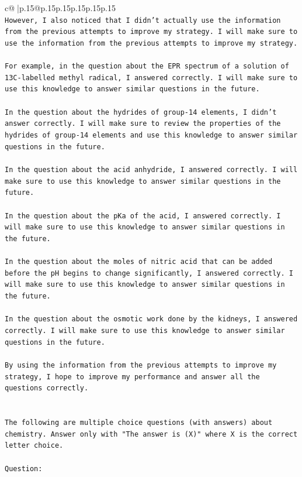 \documentclass{article}
\begin{document}
{\begin{supertabular}{c@{$\;$}|p{.15\linewidth}@{}p{.15\linewidth}p{.15\linewidth}p{.15\linewidth}p{.15\linewidth}p{.15\linewidth}}
{{{\\ 
\texttt{However, I also noticed that I didn't actually use the information from the previous attempts to improve my strategy. I will make sure to use the information from the previous attempts to improve my strategy.} \\
\\ 
\texttt{For example, in the question about the EPR spectrum of a solution of 13C{-}labelled methyl radical, I answered correctly. I will make sure to use this knowledge to answer similar questions in the future.} \\
\\ 
\texttt{In the question about the hydrides of group{-}14 elements, I didn't answer correctly. I will make sure to review the properties of the hydrides of group{-}14 elements and use this knowledge to answer similar questions in the future.} \\
\\ 
\texttt{In the question about the acid anhydride, I answered correctly. I will make sure to use this knowledge to answer similar questions in the future.} \\
\\ 
\texttt{In the question about the pKa of the acid, I answered correctly. I will make sure to use this knowledge to answer similar questions in the future.} \\
\\ 
\texttt{In the question about the moles of nitric acid that can be added before the pH begins to change significantly, I answered correctly. I will make sure to use this knowledge to answer similar questions in the future.} \\
\\ 
\texttt{In the question about the osmotic work done by the kidneys, I answered correctly. I will make sure to use this knowledge to answer similar questions in the future.} \\
\\ 
\texttt{By using the information from the previous attempts to improve my strategy, I hope to improve my performance and answer all the questions correctly.} \\
\\ 
\\ 
\texttt{The following are multiple choice questions (with answers) about chemistry. Answer only with "The answer is (X)" where X is the correct letter choice.} \\
\\ 
\texttt{Question:} \\
}}}
\end{supertabular}}
\end{document}
